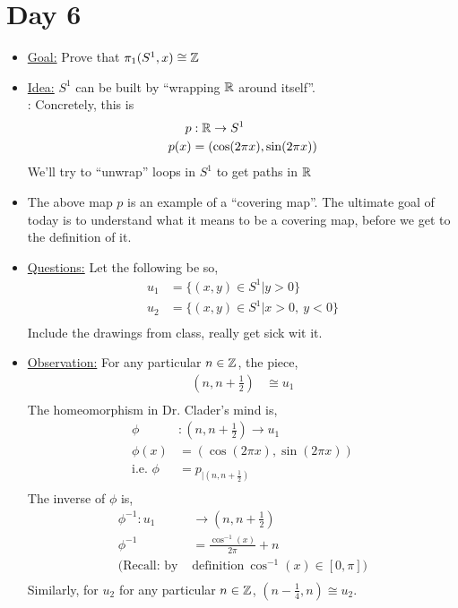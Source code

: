 \documentclass[../notes.tex]{subfiles}
\begin{document}
\section{Day 6}
    \begin{itemize}
        \item \underline{Goal:} Prove that $\pi_{1}(S^1, x)\cong \mathbb{Z}$
        \item \underline{Idea:} $S^1$ can be built by ``wrapping $\mathbb{R}$ around itself''.\\:
            Concretely, this is
            \begin{align*}
                p&: \mathbb{R} \rightarrow S^1\\
                p(x)&=(\cos(2\pi x), \sin(2\pi x))\\
            \end{align*}
            We'll try to ``unwrap'' loops in $S^1$ to get paths in $\mathbb{R}$
        \item
            The above map $p$ is an example of a ``covering map''. The ultimate goal of today is to understand
            what it means to be a covering map, before we get to the definition of it.\\
        \item \underline{Questions:} Let the following be so,
            \begin{align*}
                u_1&=\{(x,y)\in S^1| y>0\}\\
                u_2&=\{(x,y)\in S^1| x>0,\ y<0\}\\
            \end{align*}
            Include the drawings from class, really get sick wit it.
        \item \underline{Observation:} For any particular $n\in \mathbb{Z}$, the piece,
            \begin{align*}
                (n, n+\frac{1}{2})&\cong u_1\\
            \end{align*}
            The homeomorphism in Dr. Clader's mind is,
            \begin{align*}
                \phi&: (n,n+\frac{1}{2})\rightarrow u_1\\
                \phi(x)&=(\cos(2\pi x), \sin(2\pi x))\\
                \text{i.e. } \phi&=p_{|(n,n+\frac{1}{2})}\\
            \end{align*}
            The inverse of $\phi$ is,
            \begin{align*}
                \phi^{-1}: u_1&\rightarrow(n,n+\frac{1}{2})\\
                \phi^{-1}&=\frac{\cos^{-1} (x)}{2\pi}+n\\
                (\text{Recall: by }&\text{definition}\ \cos^{-1}(x)\in[0,\pi])\\
            \end{align*}
            Similarly, for $u_2$ for any particular $n\in \mathbb{Z}$, $(n-\frac{1}{4}, n)\cong u_2$.
    \end{itemize}
\end{document}
